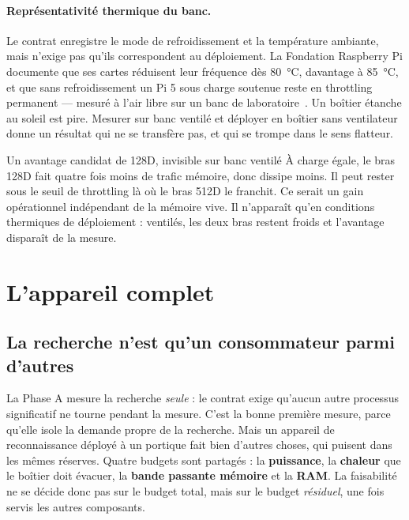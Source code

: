 \documentclass[11pt,a4paper]{article}
\begin{document}
\paragraph{Représentativité thermique du banc.} Le contrat enregistre le mode de
refroidissement et la température ambiante, mais n'exige pas qu'ils correspondent au
déploiement. La Fondation Raspberry Pi documente que ses cartes réduisent leur
fréquence dès \SI{80}{\celsius}, davantage à \SI{85}{\celsius}, et que sans
refroidissement un Pi 5 sous charge soutenue reste en throttling permanent — mesuré
à l'air libre sur un banc de laboratoire~\cite{rpiheat}. Un boîtier étanche au
soleil est pire. Mesurer sur banc ventilé et déployer en boîtier sans ventilateur
donne un résultat qui ne se transfère pas, et qui se trompe dans le sens flatteur.

\begin{alerte}{Un avantage candidat de 128D, invisible sur banc ventilé}
À charge égale, le bras 128D fait quatre fois moins de trafic mémoire, donc dissipe
moins. Il peut rester sous le seuil de throttling là où le bras 512D le franchit. Ce
serait un gain opérationnel indépendant de la mémoire vive. Il n'apparaît qu'en
conditions thermiques de déploiement : ventilés, les deux bras restent froids et
l'avantage disparaît de la mesure.
\end{alerte}

\section{L'appareil complet}\label{sec:appareil}

\subsection{La recherche n'est qu'un consommateur parmi d'autres}

La Phase A mesure la recherche \emph{seule} : le contrat exige qu'aucun autre
processus significatif ne tourne pendant la mesure. C'est la bonne première mesure,
parce qu'elle isole la demande propre de la recherche. Mais un appareil de
reconnaissance déployé à un portique fait bien d'autres choses, qui puisent dans les
mêmes réserves. Quatre budgets sont partagés : la \textbf{puissance}, la
\textbf{chaleur} que le boîtier doit évacuer, la \textbf{bande passante mémoire} et
la \textbf{RAM}. La faisabilité ne se décide donc pas sur le budget total, mais sur le
budget \emph{résiduel}, une fois servis les autres composants.
\end{document}
